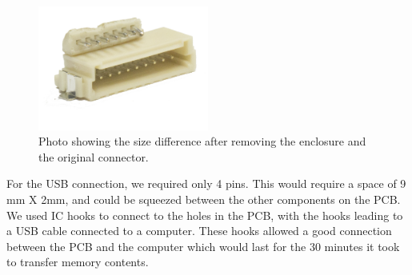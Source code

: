 \begin{figure}
\begin{center}
\includegraphics[width=0.5\textwidth]{images/ConnectorBoth.JPG}
\caption{Photo showing the size difference after removing the enclosure and the original connector.}
\label{Fig:ConnectorBoth}
\end{center}
\end{figure}
For the USB connection, we required only 4 pins.
This would require a space of 9 mm X 2mm,
and could be squeezed between the other components on the PCB.
We used IC hooks to connect to the holes in the PCB,
with the hooks leading to a USB cable connected to a computer.
These hooks allowed a good connection between the PCB and the computer which would last for the 30 minutes it took to transfer memory contents.